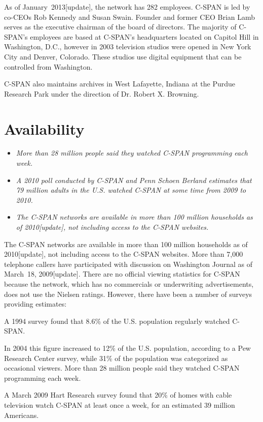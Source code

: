 As of January~2013{[}update{]}, the network has 282 employees. C-SPAN is
led by co-CEOs Rob Kennedy and Susan Swain. Founder and former CEO Brian
Lamb serves as the executive chairman of the board of directors. The
majority of C-SPAN's employees are based at C-SPAN's headquarters
located on Capitol Hill in Washington, D.C., however in 2003 television
studios were opened in New York City and Denver, Colorado. These studios
use digital equipment that can be controlled from Washington.

C-SPAN also maintains archives in West Lafayette, Indiana at the Purdue
Research Park under the direction of Dr. Robert X. Browning.

\section{Availability}\label{availability}

\begin{itemize}
\item
  \emph{More than 28 million people said they watched C-SPAN programming
  each week.}
\item
  \emph{A 2010 poll conducted by C-SPAN and Penn Schoen Berland
  estimates that 79 million adults in the U.S. watched C-SPAN at some
  time from 2009 to 2010.}
\item
  \emph{The C-SPAN networks are available in more than 100 million
  households as of 2010{[}update{]}, not including access to the C-SPAN
  websites.}
\end{itemize}

The C-SPAN networks are available in more than 100 million households as
of 2010{[}update{]}, not including access to the C-SPAN websites. More
than 7,000 telephone callers have participated with discussion on
Washington Journal as of March~18, 2009{[}update{]}. There are no
official viewing statistics for C-SPAN because the network, which has no
commercials or underwriting advertisements, does not use the Nielsen
ratings. However, there have been a number of surveys providing
estimates:

A 1994 survey found that 8.6\% of the U.S. population regularly watched
C-SPAN.

In 2004 this figure increased to 12\% of the U.S. population, according
to a Pew Research Center survey, while 31\% of the population was
categorized as occasional viewers. More than 28 million people said they
watched C-SPAN programming each week.

A March 2009 Hart Research survey found that 20\% of homes with cable
television watch C-SPAN at least once a week, for an estimated 39
million Americans.

